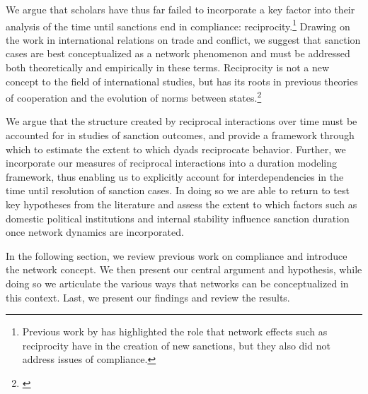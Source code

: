 We argue that scholars have thus far failed to incorporate a key factor into their analysis of the time until sanctions end in compliance: reciprocity.\footnote{Previous work by \cite{cranmer2014reciprocity} has highlighted the role that network effects such as reciprocity have in the creation of new sanctions, but they also did not address issues of compliance.} Drawing on the work in international relations on trade and conflict, we suggest that sanction cases are best conceptualized as a network phenomenon and must be addressed both theoretically and empirically in these terms. Reciprocity is not a new concept to the field of international studies, but has its roots in previous theories of cooperation and the evolution of norms between states.\footnote{\cite{richardsonai:1960,choucri:north:1972,goldstein1991reciprocity,ward1992reciprocity}} 


We argue that the structure created by reciprocal interactions over time must be accounted for in studies of sanction outcomes, and provide a framework through which to estimate the extent to which dyads reciprocate behavior. Further, we incorporate our measures of reciprocal interactions into a duration modeling framework, thus enabling us to explicitly account for interdependencies in the time until resolution of sanction cases. In doing so we are able to return to test key hypotheses from the literature and assess the extent to which factors such as domestic political institutions and internal stability influence sanction duration once network dynamics are incorporated.  

In the following section, we review previous work on compliance and introduce the network concept. We then present our central argument and hypothesis, while doing so we articulate the various ways that networks can be conceptualized in this context. Last, we present our findings and review the results.

